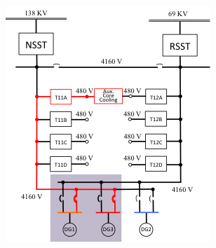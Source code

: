 \begin{figure}
        \centering %
        ~ %
        \begin{subfigure}[b]{0.3\textwidth}
                \centering
                \includegraphics[width=\textwidth]{figures/ACpowerRecPathDGs.png}
                \caption{}
                \label{fig:ACpowerDGs}
        \end{subfigure}
        \begin{subfigure}[b]{0.3\textwidth}
                \centering

\end{subfigure}
\end{figure}
